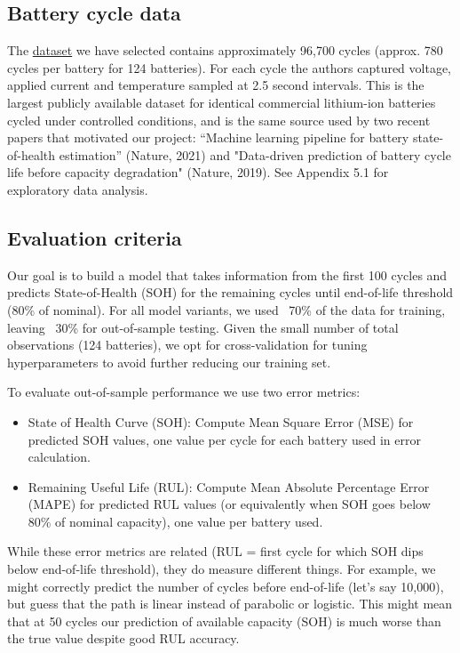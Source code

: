 \documentclass{article}
\begin{document}
\subsection{Battery cycle data}
The \href{https://data.matr.io/1/projects/5c48dd2bc625d700019f3204}{dataset} we have selected contains approximately 96,700 cycles (approx. 780 cycles per battery for 124 batteries). For each cycle the authors captured voltage, applied current and temperature sampled at 2.5 second intervals. This is the largest publicly available dataset for identical commercial lithium-ion batteries cycled under controlled conditions, and is the same source used by two recent papers that motivated our project: “Machine learning pipeline for battery state-of-health estimation” (Nature, 2021)\cite{roman2021machine} and "Data-driven prediction of battery cycle life before capacity degradation" (Nature, 2019)\cite{severson2019data}. See Appendix 5.1 for exploratory data analysis.

\subsection{Evaluation criteria}
Our goal is to build a model that takes information from the first 100 cycles and predicts State-of-Health (SOH) for the remaining cycles until end-of-life threshold (80\% of nominal). For all model variants, we used ~70\% of the data for training, leaving ~30\% for out-of-sample testing.  Given the small number of total observations (124 batteries), we opt for cross-validation for tuning hyperparameters to avoid further reducing our training set. 

To evaluate out-of-sample performance we use two error metrics:
\begin{itemize}
    \item State of Health Curve (SOH): Compute Mean Square Error (MSE) for predicted SOH values, one value per cycle for each battery used in error calculation. %
    \item Remaining Useful Life (RUL): Compute Mean Absolute Percentage Error (MAPE) for predicted RUL values (or equivalently when SOH goes below 80\% of nominal capacity), one value per battery used.
    
\end{itemize}

While these error metrics are related (RUL = first cycle for which SOH dips below end-of-life threshold), they do measure different things. For example, we might correctly predict the number of cycles before end-of-life (let's say 10,000), but guess that the path is linear instead of parabolic or logistic. This might mean that at 50 cycles our prediction of available capacity (SOH) is much worse than the true value despite good RUL accuracy. 
\end{document}
